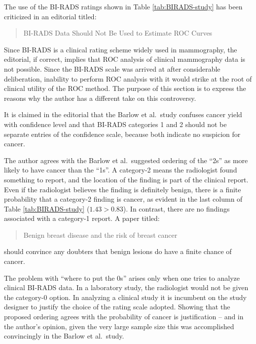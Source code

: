 \documentclass[
]{book}
\begin{document}
The use of the BI-RADS ratings shown in Table \ref{tab:BIRADS-study} has been criticized \citep{RN2166} in an editorial titled:

\begin{quote}
BI-RADS Data Should Not Be Used to Estimate ROC Curves
\end{quote}

Since BI-RADS is a clinical rating scheme widely used in mammography, the editorial, if correct, implies that ROC analysis of clinical mammography data is not possible. Since the BI-RADS scale was arrived at after considerable deliberation, inability to perform ROC analysis with it would strike at the root of clinical utility of the ROC method. The purpose of this section is to express the reasons why the author has a different take on this controversy.

It is claimed in the editorial that the Barlow et al.~study confuses cancer yield with confidence level and that BI-RADS categories 1 and 2 should not be separate entries of the confidence scale, because both indicate no suspicion for cancer.

The author agrees with the Barlow et al.~suggested ordering of the ``2s'' as more likely to have cancer than the ``1s''. A category-2 means the radiologist found something to report, and the location of the finding is part of the clinical report. Even if the radiologist believes the finding is definitely benign, there is a finite probability that a category-2 finding is cancer, as evident in the last column of Table \ref{tab:BIRADS-study} (\(1.43 > 0.83\)). In contrast, there are no findings associated with a category-1 report. A paper \citep{hartmann2005benign} titled:

\begin{quote}
Benign breast disease and the risk of breast cancer
\end{quote}

should convince any doubters that benign lesions do have a finite chance of cancer.

The problem with ``where to put the 0s'' arises only when one tries to analyze clinical BI-RADS data. In a laboratory study, the radiologist would not be given the category-0 option. In analyzing a clinical study it is incumbent on the study designer to justify the choice of the rating scale adopted. Showing that the proposed ordering agrees with the probability of cancer is justification -- and in the author's opinion, given the very large sample size this was accomplished convincingly in the Barlow et al.~study.
\end{document}
